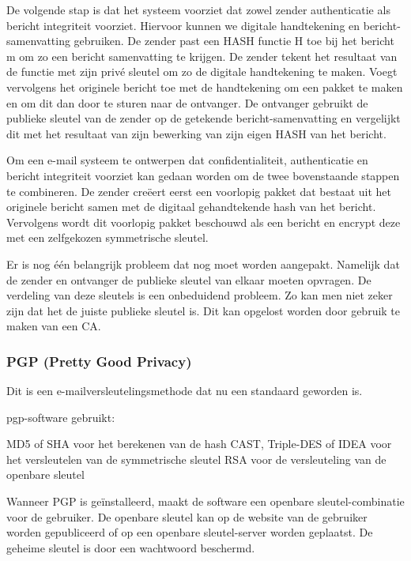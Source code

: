 \noindent De volgende stap is dat het systeem voorziet dat zowel zender authenticatie als bericht integriteit voorziet. Hiervoor kunnen we digitale handtekening en bericht-samenvatting gebruiken. De zender past een HASH functie H toe bij het bericht m om zo een bericht samenvatting te krijgen. De zender tekent het resultaat van de functie met zijn privé sleutel om zo de digitale handtekening te maken. Voegt vervolgens het originele bericht toe met de handtekening om een pakket te maken en om dit dan door te sturen naar de ontvanger. De ontvanger gebruikt de publieke sleutel van de zender op de getekende bericht-samenvatting en vergelijkt dit met het resultaat van zijn bewerking van zijn eigen HASH van het bericht.

\noindent Om een e-mail systeem te ontwerpen dat confidentialiteit, authenticatie en bericht integriteit voorziet kan gedaan worden om de twee bovenstaande stappen te combineren. De zender creëert eerst een voorlopig pakket dat bestaat uit het originele bericht samen met de digitaal gehandtekende hash van het bericht. Vervolgens wordt dit voorlopig pakket beschouwd als een bericht en encrypt deze met een zelfgekozen symmetrische sleutel.

\noindent Er is nog één belangrijk probleem dat nog moet worden aangepakt. Namelijk dat de zender en ontvanger de publieke sleutel van elkaar moeten opvragen. De verdeling van deze sleutels is een onbeduidend probleem. Zo kan men niet zeker zijn dat het de juiste publieke sleutel is. Dit kan opgelost worden door gebruik te maken van een CA.

\subsubsection{PGP (Pretty Good Privacy)}

\fra  Dit is een e-mailversleutelingsmethode dat nu een standaard geworden is.

\noindent \acrshort{pgp}-software gebruikt:

\bi
\itf MD5 of SHA voor het berekenen van de hash
\itf CAST, Triple-DES of IDEA voor het versleutelen van de symmetrische sleutel
\itf RSA voor de versleuteling van de openbare sleutel
\ei
	
\noindent Wanneer PGP is geïnstalleerd, maakt de software een openbare sleutel-combinatie voor de gebruiker. De openbare sleutel kan op de website van de gebruiker worden gepubliceerd of op een openbare sleutel-server worden geplaatst. De geheime sleutel is door een wachtwoord beschermd.

